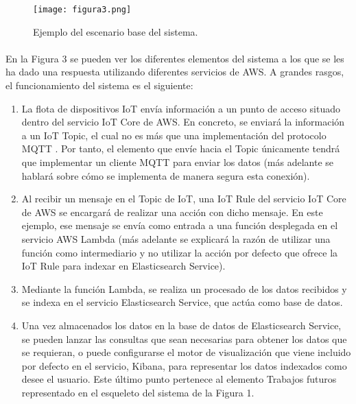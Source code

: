 \documentclass[../../memoria.tex]{subfiles}
\begin{document}
\begin{figure}[H]
    \centering
    \texttt{[image: figura3.png]}
    \caption{Ejemplo del escenario base del sistema.}
    \label{fig:figura3}
\end{figure}

\paragraph{}
En la Figura 3 se pueden ver los diferentes elementos del sistema a los que se les ha dado una respuesta utilizando diferentes servicios de AWS. A grandes rasgos, el funcionamiento del sistema es el siguiente:

\begin{enumerate}
    \item La flota de dispositivos IoT envía información a un punto de acceso situado dentro del servicio IoT Core de AWS. En concreto, se enviará la información a un IoT Topic, el cual no es más que una implementación del protocolo MQTT \cite{mqtt}. Por tanto, el elemento que envíe hacia el Topic únicamente tendrá que implementar un cliente MQTT para enviar los datos (más adelante se hablará sobre cómo se implementa de manera segura esta conexión).

    \item Al recibir un mensaje en el Topic de IoT, una IoT Rule del servicio IoT Core de AWS se encargará de realizar una acción con dicho mensaje. En este ejemplo, ese mensaje se envía como entrada a una función desplegada en el servicio AWS Lambda (más adelante se explicará la razón de utilizar una función como intermediario y no utilizar la acción por defecto que ofrece la IoT Rule para indexar en Elasticsearch Service).

    \item Mediante la función Lambda, se realiza un procesado de los datos recibidos y se indexa en el servicio Elasticsearch Service, que actúa como base de datos.

    \item Una vez almacenados los datos en la base de datos de Elasticsearch Service, se pueden lanzar las consultas que sean necesarias para obtener los datos que se requieran, o puede configurarse el motor de visualización que viene incluido por defecto en el servicio, Kibana, para representar los datos indexados como desee el usuario. Este último punto pertenece al elemento Trabajos futuros representado en el esqueleto del sistema de la Figura 1.
\end{enumerate}
\end{document}
